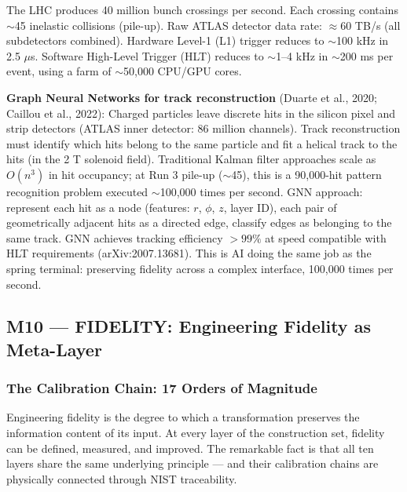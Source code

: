 \documentclass[11pt,letterpaper]{article}
\begin{document}
The LHC produces 40 million bunch crossings per second. Each crossing contains $\sim$45
inelastic collisions (pile-up). Raw ATLAS detector data rate: $\approx$60 TB/s (all subdetectors
combined). Hardware Level-1 (L1) trigger reduces to $\sim$100 kHz in 2.5 $\mu$s. Software
High-Level Trigger (HLT) reduces to $\sim$1--4 kHz in $\sim$200 ms per event, using a farm of
$\sim$50,000 CPU/GPU cores.

\textbf{Graph Neural Networks for track reconstruction} (Duarte et al., 2020; Caillou et al.,
2022): Charged particles leave discrete hits in the silicon pixel and strip detectors (ATLAS inner
detector: 86 million channels). Track reconstruction must identify which hits belong to the same
particle and fit a helical track to the hits (in the 2 T solenoid field). Traditional Kalman filter
approaches scale as $O(n^3)$ in hit occupancy; at Run 3 pile-up ($\sim$45), this is a 90,000-hit
pattern recognition problem executed $\sim$100,000 times per second. GNN approach: represent each
hit as a node (features: $r$, $\phi$, $z$, layer ID), each pair of geometrically adjacent hits as a
directed edge, classify edges as belonging to the same track. GNN achieves tracking efficiency
$> 99\%$ at speed compatible with HLT requirements (arXiv:2007.13681). This is AI doing the same
job as the spring terminal: preserving fidelity across a complex interface, 100,000 times per
second.

\subsection{M10 --- FIDELITY: Engineering Fidelity as Meta-Layer}

\subsubsection{The Calibration Chain: 17 Orders of Magnitude}

Engineering fidelity is the degree to which a transformation preserves the information content
of its input. At every layer of the construction set, fidelity can be defined, measured, and
improved. The remarkable fact is that all ten layers share the same underlying principle ---
and their calibration chains are physically connected through NIST traceability.
\end{document}
